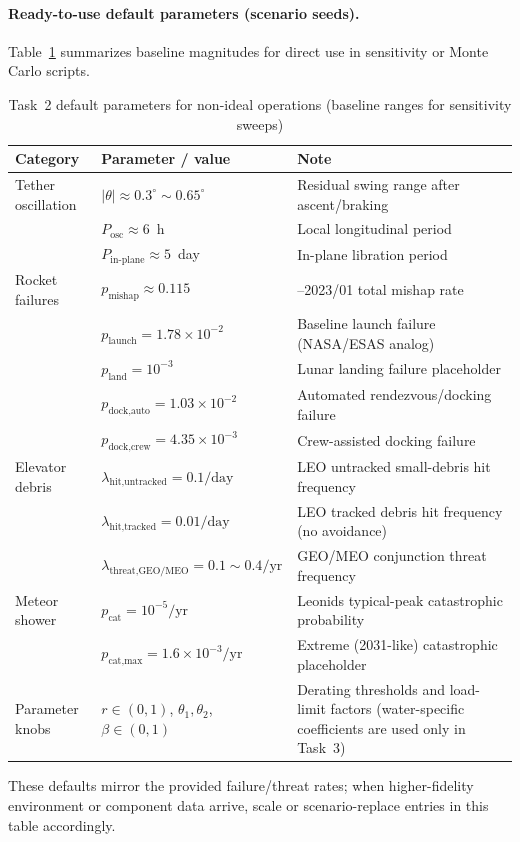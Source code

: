 ﻿\documentclass{mcmthesis}
\begin{document}
\paragraph{Ready-to-use default parameters (scenario seeds).}
Table~\ref{tab:default_params_task2} summarizes baseline magnitudes for direct use in sensitivity or Monte Carlo scripts.

\begin{table}[htbp]
\centering
\caption{Task~2 default parameters for non-ideal operations (baseline ranges for sensitivity sweeps)}
\label{tab:default_params_task2}
\renewcommand{\arraystretch}{1.12}
\begin{tabularx}{\textwidth}{@{}l >{\raggedright\arraybackslash}X >{\raggedright\arraybackslash}X@{}}
\toprule
\textbf{Category} & \textbf{Parameter / value} & \textbf{Note} \\
\midrule
Tether oscillation & $|\theta|\approx0.3^{\circ}\sim0.65^{\circ}$ & Residual swing range after ascent/braking \\
 & $P_{\text{osc}}\approx6$~h & Local longitudinal period \\
 & $P_{\text{in-plane}}\approx5$~day & In-plane libration period \\
Rocket failures & $p_{\text{mishap}}\approx0.115$ & 2000--2023/01 total mishap rate \\
 & $p_{\text{launch}}=1.78\times10^{-2}$ & Baseline launch failure (NASA/ESAS analog) \\
 & $p_{\text{land}}=10^{-3}$ & Lunar landing failure placeholder \\
 & $p_{\text{dock,auto}}=1.03\times10^{-2}$ & Automated rendezvous/docking failure \\
 & $p_{\text{dock,crew}}=4.35\times10^{-3}$ & Crew-assisted docking failure \\
Elevator debris & $\lambda_{\text{hit,untracked}}=0.1/\text{day}$ & LEO untracked small-debris hit frequency \\
 & $\lambda_{\text{hit,tracked}}=0.01/\text{day}$ & LEO tracked debris hit frequency (no avoidance) \\
 & $\lambda_{\text{threat,GEO/MEO}}=0.1\sim0.4/\text{yr}$ & GEO/MEO conjunction threat frequency \\
Meteor shower & $p_{\text{cat}}=10^{-5}/\text{yr}$ & Leonids typical-peak catastrophic probability \\
 & $p_{\text{cat,max}}=1.6\times10^{-3}/\text{yr}$ & Extreme (2031-like) catastrophic placeholder \\
Parameter knobs & $r\in(0,1)$, $\theta_1,\theta_2$, $\beta\in(0,1)$ & Derating thresholds and load-limit factors (water-specific coefficients are used only in Task~3) \\
\bottomrule
\end{tabularx}
\end{table}
These defaults mirror the provided failure/threat rates; when higher-fidelity environment or component data arrive, scale or scenario-replace entries in this table accordingly.
\end{document}
